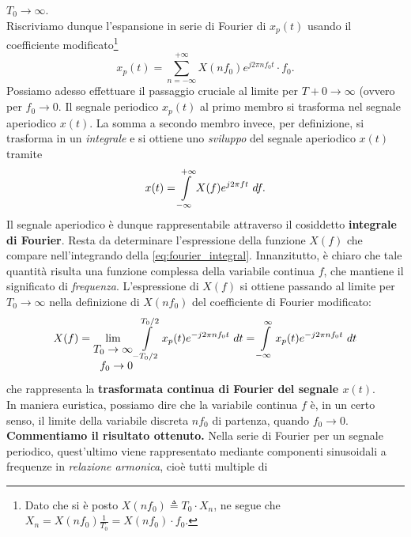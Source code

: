 \documentclass[12pt,oneside,openany]{memoir}
\numberwithin{equation}{subsection}
\newcommand{\dt}{\ dt}
\newcommand{\df}{\ df}
\begin{document}
$T_0 \rightarrow \infty$.\\
Riscriviamo dunque l'espansione in serie di Fourier di $x_p(t)$ usando il
coefficiente modificato\footnote{Dato che si \`e posto
$X(nf_0) \triangleq T_0 \cdot X_n$, ne segue che
$X_n = X(n f_0) \frac{1}{T_0} = X(n f_0) \cdot f_0$.}
\begin{equation}
	x_p(t) = \sum_{n = -\infty}^{+\infty} X(n f_0) e^{j 2 \pi n f_0 t}
	\cdot f_0.
\end{equation}
Possiamo adesso effettuare il passaggio cruciale al limite per
$T+0 \rightarrow \infty$ (ovvero per $f_0 \rightarrow 0$. Il segnale periodico
$x_p(t)$ al primo membro si trasforma nel segnale aperiodico $x(t)$. La somma a
secondo membro invece, per definizione, si trasforma in un \textit{integrale} e
si ottiene uno \textit{sviluppo} del segnale aperiodico $x(t)$ tramite
\begin{equation}\label{eq:fourier_integral}
	x(t) = \int\displaylimits_{-\infty}^{+\infty} X(f) e^{j 2 \pi f t} \df.
\end{equation}
Il segnale aperiodico \`e dunque rappresentabile attraverso il cosiddetto
\textbf{integrale di Fourier}. Resta da determinare l'espressione della funzione
$X(f)$ che compare nell'integrando della \eqref{eq:fourier_integral}.
Innanzitutto, \`e chiaro che tale quantit\`a risulta una funzione complessa
della variabile continua $f$, che mantiene il significato di \textit{frequenza}.
L'espressione di $X(f)$ si ottiene passando al limite per
$T_0 \rightarrow \infty$ nella definizione di $X(nf_0)$ del coefficiente di
Fourier modificato:
\begin{equation}\label{eq:tcf_coefficient}
	X(f) = \lim_{\begin{split}T_0 \rightarrow \infty \\ f_0 \rightarrow 0\end{split}}
		\int\displaylimits_{-T_0/2}^{T_0/2} x_p(t) e^{-j 2 \pi n f_0 t}
		\dt = \int\displaylimits_{-\infty}^{\infty} x_p(t)
		e^{-j 2 \pi n f_0 t} \dt 
\end{equation}
che rappresenta la \textbf{trasformata continua di Fourier del segnale $x(t)$}.\\
In maniera euristica, possiamo dire che la variabile continua $f$ \`e, in un
certo senso, il limite della variabile discreta $n f_0$ di partenza, quando
$f_0 \rightarrow 0$.
\bigbreak
\textbf{Commentiamo il risultato ottenuto.} Nella serie di Fourier per un
segnale periodico, quest'ultimo viene rappresentato mediante componenti
sinusoidali a frequenze in \textit{relazione armonica}, cio\`e tutti multiple di
\end{document}
